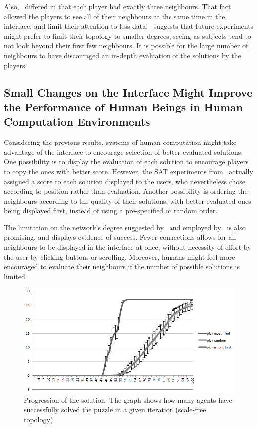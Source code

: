 \documentclass{article}
\begin{document}
Also,~\cite{mason:collablearnet} differed in that each player had exactly three neighbours. That fact allowed the players to see all of their neighbours at the same time in the interface, and limit their attention to less data.~\cite{farenzena:collabem} suggests that future experiments might prefer to limit their topology to smaller degrees, seeing as subjects tend to not look beyond their first few neighbours. It is possible for the large number of neighbours to have discouraged an in-depth evaluation of the solutions by the players.

\subsection{Small Changes on the Interface Might Improve the Performance of Human Beings in Human Computation Environments}

Considering the previous results, systems of human computation might take advantage of the interface to encourage selection of better-evaluated solutions. One possibility is to display the evaluation of each solution to encourage players to copy the ones with better score. However, the SAT experiments from~\cite{farenzena:collabem} actually assigned a score to each solution displayed to the users, who nevertheless chose according to position rather than evaluation. Another possibility is ordering the neighbours according to the quality of their solutions, with better-evaluated ones being displayed first, instead of using a pre-specified or random order.

The limitation on the network's degree suggested by~\cite{farenzena:collabem} and employed by~\cite{mason:collablearnet} is also promising, and displays evidence of success. Fewer connections allows for all neighbours to be displayed in the interface at once, without necessity of effort by the user by clicking buttons or scrolling. Moreover, humans might feel more encouraged to evaluate their neighbours if the number of possible solutions is limited.

\begin{figure}
\includegraphics[scale=0.45]{progression}
\caption{Progression of the solution. The graph shows how many agents have successfully solved the puzzle in a given iteration (scale-free topology)
}
\label{fig:progression}
\end{figure}
\end{document}
